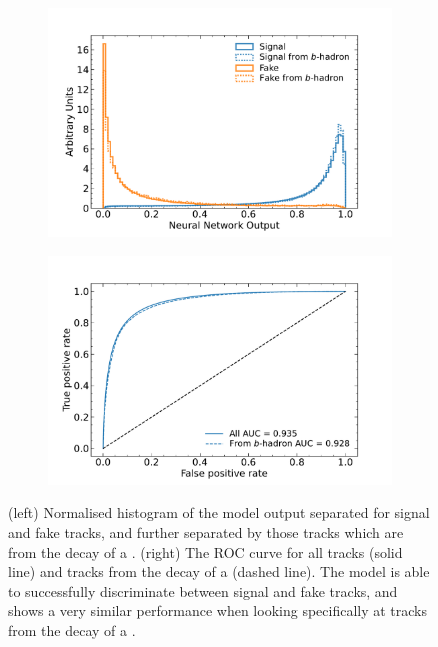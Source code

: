 \begin{figure}[!htbp]
  \centering
  \begin{subfigure}[b]{0.48\textwidth}
      \centering
      \includegraphics[width=\textwidth]{chapters/track_classifier/figs/fake_id_output.pdf}
  \end{subfigure}
  \quad
  \begin{subfigure}[b]{0.48\textwidth}
      \centering
      \includegraphics[width=\textwidth]{chapters/track_classifier/figs/fake_id_roc.pdf}
  \end{subfigure}
  \caption{
    (left) Normalised histogram of the model output separated for signal and fake tracks, and further separated by those tracks which are from the decay of a \bhadron.
    (right) The ROC curve for all tracks (solid line) and tracks from the decay of a \bhadron (dashed line).
    The model is able to successfully discriminate between signal and fake tracks, and shows a very similar performance when looking specifically at tracks from the decay of a \bhadron.
  }
  \label{fig:track_classifier_output_roc}
\end{figure}

